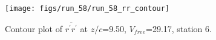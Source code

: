 \begin{figure}[H]
\centering
\texttt{[image: figs/run\_58/run\_58\_rr\_contour]}
\caption{Contour plot of $\overline{r^\prime r^\prime}$ at $z/c$=9.50, $V_{free}$=29.17, station 6.}
\end{figure}


